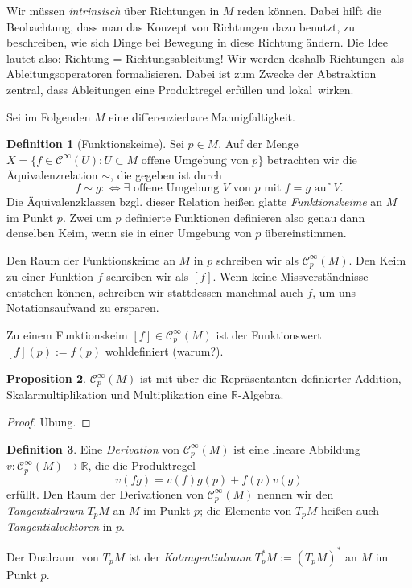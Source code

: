 \documentclass[a4paper]{scrreprt}
\numberwithin{equation}{chapter}
\newcommand{\diff}{:\Longleftrightarrow}
\newcommand{\sC}{\mathcal{C}^{\infty}}
\theoremstyle{definition}
\newtheorem{defn}{Definition}[section]
\newtheorem{prop}[defn]{Proposition}
\newcommand{\bewUeb}{\begin{proof}Übung.\end{proof}}
\begin{document}
Wir müssen \emph{intrinsisch} über Richtungen in $M$ reden können. Dabei hilft die Beobachtung, dass man das Konzept von Richtungen dazu benutzt, zu beschreiben, wie sich Dinge bei Bewegung in diese Richtung ändern. Die Idee lautet also: Richtung = Richtungsableitung! Wir werden deshalb \glqq Richtungen\grqq\ als Ableitungsoperatoren formalisieren. Dabei ist zum Zwecke der Abstraktion zentral, dass Ableitungen eine Produktregel erfüllen und \glqq lokal\grqq\ wirken.

	Sei im Folgenden $M$ eine differenzierbare Mannigfaltigkeit.

\begin{defn}[Funktionskeime]
	Sei $p \in M$. Auf der Menge $X = \{f \in \sC(U) : U \subset M \text{ offene Umgebung von } p\}$ betrachten wir die Äquivalenzrelation $\sim$, die gegeben ist durch
	\[f \sim g \diff \exists \text{ offene Umgebung } V \text{ von } p \text{ mit } f = g \text{ auf } V.\]
	Die Äquivalenzklassen bzgl. dieser Relation heißen glatte \emph{Funktionskeime} an $M$ im Punkt $p$. Zwei um $p$ definierte Funktionen definieren also genau dann denselben Keim, wenn sie in einer Umgebung von $p$ übereinstimmen.

	Den Raum der Funktionskeime an $M$ in $p$ schreiben wir als $\sC_p(M)$. Den Keim zu einer Funktion $f$ schreiben wir als $[f]$. Wenn keine Missverständnisse entstehen können, schreiben wir stattdessen manchmal auch $f$, um uns Notationsaufwand zu ersparen.
\end{defn}

Zu einem Funktionskeim $[f] \in \sC_p(M)$ ist der Funktionswert $[f](p) := f(p)$ wohldefiniert (warum?).

\begin{prop}
	$\sC_p(M)$ ist mit über die Repräsentanten definierter Addition, Skalarmultiplikation und Multiplikation eine $\mathbb R$-Algebra. \bewUeb
\end{prop}

\begin{defn}
	Eine \emph{Derivation} von $\sC_p(M)$ ist eine lineare Abbildung $v\colon \sC_p(M) \to \mathbb R$, die die \glqq Produktregel\grqq\ \[v(fg) = v(f) g(p) + f(p) v(g)\] erfüllt. Den Raum der Derivationen von $\sC_p(M)$ nennen wir den \emph{Tangentialraum} $T_pM$ an $M$ im Punkt $p$; die Elemente von $T_pM$ heißen auch \emph{Tangentialvektoren} in $p$.

	Der Dualraum von $T_pM$ ist der \emph{Kotangentialraum} $T_p^*M := (T_pM)^*$ an $M$ im Punkt $p$.
\end{defn}
\end{document}
